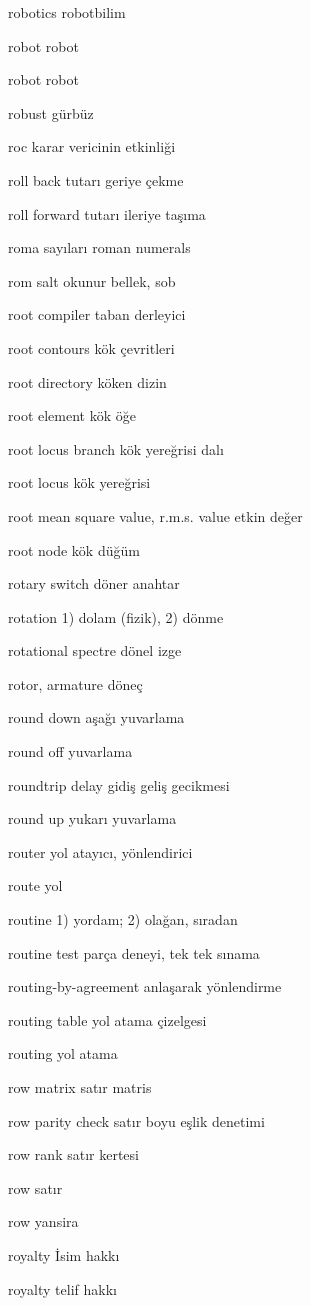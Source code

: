 \documentclass[12pt,fleqn]{article}\usepackage{../../common}
\begin{document}
robotics robotbilim

robot robot

robot robot

robust gürbüz

roc karar vericinin etkinliği

roll back tutarı geriye çekme

roll forward tutarı ileriye taşıma

roma sayıları roman numerals

rom salt okunur bellek, sob

root compiler taban derleyici

root contours kök çevritleri

root directory köken dizin

root element kök öğe

root locus branch kök yereğrisi dalı

root locus kök yereğrisi

root mean square value, r.m.s. value etkin değer

root node kök düğüm

rotary switch döner anahtar

rotation 1) dolam (fizik), 2) dönme

rotational spectre dönel izge

rotor, armature döneç

round down aşağı yuvarlama

round off yuvarlama

roundtrip delay gidiş geliş gecikmesi

round up yukarı yuvarlama

router yol atayıcı, yönlendirici

route yol

routine 1) yordam; 2) olağan, sıradan

routine test parça deneyi, tek tek sınama

routing-by-agreement anlaşarak yönlendirme

routing table yol atama çizelgesi

routing yol atama

row matrix satır matris

row parity check satır boyu eşlik denetimi

row rank satır kertesi

row satır

row yansira

royalty İsim hakkı

royalty telif hakkı
\end{document}
